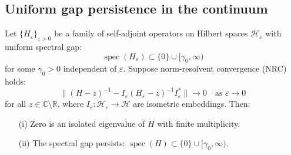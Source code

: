 \documentclass[11pt]{amsart}
\begin{document}
\subsection*{Uniform gap persistence in the continuum}

\begin{theorem}\label{thm:gap-persist}
Let $\{H_\varepsilon\}_{\varepsilon > 0}$ be a family of self-adjoint operators on Hilbert spaces $\mathcal{H}_\varepsilon$ with uniform spectral gap:
\[
  \operatorname{spec}(H_\varepsilon) \subset \{0\} \cup [\gamma_0, \infty)
\]
for some $\gamma_0 > 0$ independent of $\varepsilon$. Suppose norm-resolvent convergence (NRC) holds:
\[
  \|(H - z)^{-1} - I_\varepsilon (H_\varepsilon - z)^{-1} I_\varepsilon^*\| \to 0 \quad \text{as } \varepsilon \to 0
\]
for all $z \in \mathbb{C} \setminus \mathbb{R}$, where $I_\varepsilon: \mathcal{H}_\varepsilon \to \mathcal{H}$ are isometric embeddings. Then:
\begin{itemize}
  \item[(i)] Zero is an isolated eigenvalue of $H$ with finite multiplicity.
  \item[(ii)] The spectral gap persists: $\operatorname{spec}(H) \subset \{0\} \cup [\gamma_0, \infty)$.
\end{itemize}
\end{theorem}
\end{document}
